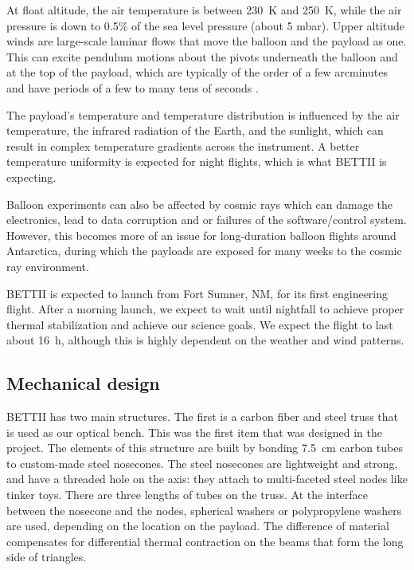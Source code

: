 At float altitude, the air temperature is between \SI{230}{\kelvin} and \SI{250}{\kelvin}, while the air pressure is down to 0.5\% of the sea level pressure (about 5 mbar). Upper altitude winds are large-scale laminar flows that move the balloon and the payload as one. This can excite pendulum motions about the pivots underneath the balloon and at the top of the payload, which are typically of the order of a few arcminutes and have periods of a few to many tens of seconds \citep{Fixsen:1996kha}.

The payload's temperature and temperature distribution is influenced by the air temperature, the infrared radiation of the Earth, and the sunlight, which can result in complex temperature gradients across the instrument. A better temperature uniformity is expected for night flights, which is what BETTII is expecting.

Balloon experiments can also be affected by cosmic rays which can damage the electronics, lead to data corruption and or failures of the software/control system. However, this becomes more of an issue for long-duration balloon flights around Antarctica, during which the payloads are exposed for many weeks to the cosmic ray environment.

BETTII is expected to launch from Fort Sumner, NM, for its first engineering flight. After a morning launch, we expect to wait until nightfall to achieve proper thermal stabilization and achieve our science goals. We expect the flight to last about \SI{16}{\hour}, although this is highly dependent on the weather and wind patterns.


\subsection{Mechanical design}

BETTII has two main structures. The first is a carbon fiber and steel truss that is used as our optical bench. This was the first item that was designed in the project. The elements of this structure are built by bonding \SI{7.5}{\centi\meter} carbon tubes to custom-made steel nosecones. The steel nosecones are lightweight and strong, and have a threaded hole on the axis: they attach to multi-faceted steel nodes like tinker toys. There are three lengths of tubes on the truss. At the interface between the nosecone and the nodes, spherical washers or polypropylene washers are used, depending on the location on the payload. The difference of material compensates for differential thermal contraction on the beams that form the long side of triangles.

